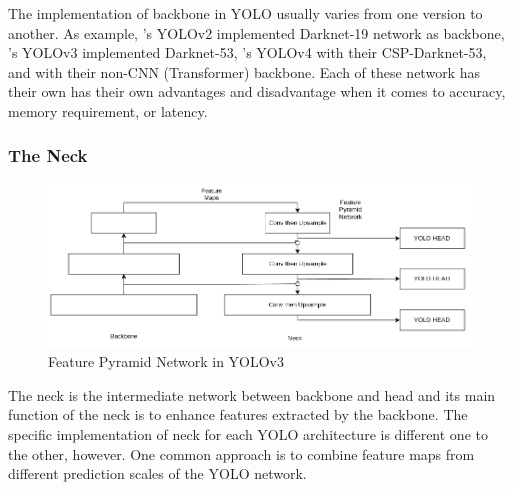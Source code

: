     The implementation of backbone in YOLO usually varies from one version to another.
    As example, \textcite{yolov2}'s YOLOv2 implemented Darknet-19 network as backbone, 
    \textcite{yolov3}'s YOLOv3 implemented Darknet-53, \textcite{yolov4}'s YOLOv4
    with their CSP-Darknet-53, and \textcite{vityolo} with their non-CNN (Transformer) backbone.
    Each of these network has their own has their own advantages and disadvantage when
    it comes to accuracy, memory requirement, or latency.


    \subsubsection{The Neck}
  
    \begin{figure}[H]
        \centering
        \includegraphics[scale=0.6]{figures/yolo-architecture-rough.png}
        \caption{Feature Pyramid Network in YOLOv3}
        \label{fig:yolofpn}
    \end{figure}

    The neck is the intermediate network between backbone and head and its
    main function of the neck is to enhance features extracted by the backbone.
    The specific implementation of neck for each YOLO architecture is different one to the other, however.
    One common approach is to combine feature maps from different prediction scales of the YOLO network.

